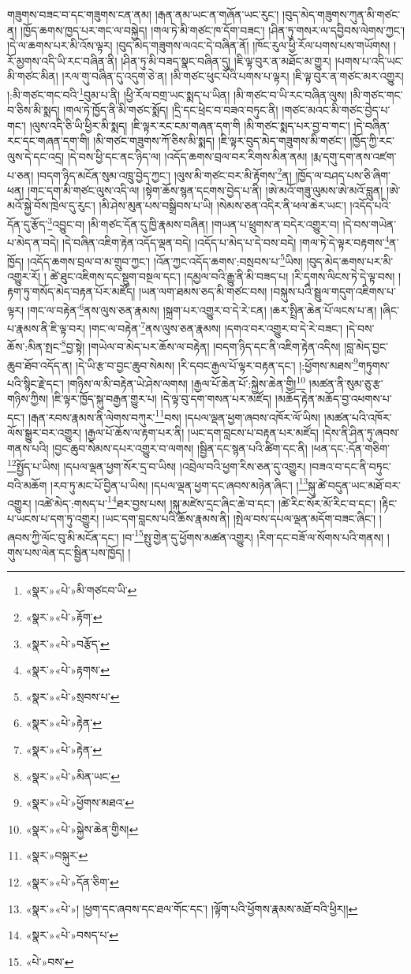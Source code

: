 གཟུགས་བཟང་བ་དང་གཟུགས་ངན་ནམ། །རྒན་ནམ་ཡང་ན་གཞོན་ཡང་རུང་། །བུད་མེད་གཟུགས་ཀུན་མི་གཙང་ན། །ཁྱོད་ཆགས་ཁྱད་པར་གང་ལ་བསྐྱེད། །གལ་ཏེ་མི་གཙང་ཁ་དོག་བཟང་། །ཤིན་ཏུ་གསར་ལ་དབྱིབས་ལེགས་ཀྱང་། །དེ་ལ་ཆགས་པར་མི་འོས་ལྟར། །བུད་མེད་གཟུགས་ལའང་དེ་བཞིན་ནོ། །ཁོང་རུལ་ཕྱི་རོལ་པགས་པས་གཡོགས། །རོ་མྱགས་འདི་ཡི་རང་བཞིན་ནི། །ཤིན་ཏུ་མི་བཟད་སྣང་བཞིན་དུ། །ཇི་ལྟ་བུར་ན་མཐོང་མ་གྱུར། །པགས་པ་འདི་ཡང་མི་གཙང་མིན། །རལ་གུ་བཞིན་དུ་འདུག་ཅེ་ན། །མི་གཙང་ཕུང་པོའི་པགས་པ་ལྟར། །ཇི་ལྟ་བུར་ན་གཙང་མར་འགྱུར། །:མི་གཙང་གང་བའི་\footnote{«སྣར་»«པེ་»མི་གཙངབ་ཡི་}བུམ་པ་ནི། །ཕྱི་རོལ་བགྲ་ཡང་སྨད་པ་ཡིན། །མི་གཙང་བ་ཡི་རང་བཞིན་ལུས། །མི་གཙང་གང་བ་ཅིས་མི་སྨད། །གལ་ཏེ་ཁྱོད་ནི་མི་གཙང་སྨོད། །དྲི་དང་ཕྲེང་བ་བཟའ་བཏུང་ནི། །གཙང་མའང་མི་གཙང་བྱེད་པ་གང་། །ལུས་འདི་ཅི་ཡི་ཕྱིར་མི་སྨད། །ཇི་ལྟར་རང་ངམ་གཞན་དག་གི །མི་གཙང་སྨད་པར་བྱ་བ་གང་། །དེ་བཞིན་རང་དང་གཞན་དག་གི། །མི་གཙང་གཟུགས་ཀོ་ཅིས་མི་སྨད། །ཇི་ལྟར་བུད་མེད་གཟུགས་མི་གཙང་། །ཁྱོད་ཀྱི་རང་ལུས་དེ་དང་འདྲ། །དེ་བས་ཕྱི་དང་ནང་ཉིད་ལ། །འདོད་ཆགས་བྲལ་བར་རིགས་མིན་ནམ། །རྨ་དགུ་དག་ནས་འཛག་པ་ཅན། །བདག་ཉིད་མངོན་སུམ་འཁྲུ་བྱེད་ཀྱང་། །ལུས་མི་གཙང་བར་མི་རྟོགས་\footnote{«སྣར་»«པེ་»རྟོག་}ན། །ཁྱོད་ལ་བཤད་པས་ཅི་ཞིག་ཕན། །གང་དག་མི་གཙང་ལུས་འདི་ལ། །སྟེག་ཆོས་སྙན་དངགས་བྱེད་པ་ནི། །ཨེ་མའོ་གཟུ་ལུམས་ཨེ་མའོ་བླུན། །ཨེ་མའོ་སྐྱེ་བོས་ཁྲེལ་དུ་རུང་། །མི་ཤེས་མུན་པས་བསྒྲིབས་པ་ཡི། །སེམས་ཅན་འདིར་ནི་ཕལ་ཆེར་ཡང་། །འདོད་པའི་དོན་དུ་རྩོད་\footnote{«སྣར་»«པེ་»བརྩོད་}འབྱུང་བ། །མི་གཙང་དོན་དུ་ཁྱི་རྣམས་བཞིན། །གཡན་པ་ཕྲུགས་ན་བདེར་འགྱུར་བ། །དེ་བས་གཡེན་པ་མེད་ན་བདེ། །དེ་བཞིན་འཇིག་རྟེན་འདོད་ལྡན་བདེ། །འདོད་པ་མེད་པ་དེ་བས་བདེ། །གལ་ཏེ་དེ་ལྟར་བརྟགས་\footnote{«སྣར་»«པེ་»རྟགས་}ན་ཁྱོད། །འདོད་ཆགས་བྲལ་བ་མ་གྲུབ་ཀྱང་། །འོན་ཀྱང་འདོད་ཆགས་:བསྲབས་པ་\footnote{«སྣར་»«པེ་»སྲབས་པ་}ཡིས། །བུད་མེད་ཆགས་པར་མི་འགྱུར་རོ། །
ཚེ་ཐུང་འཇིགས་དང་སྡུག་བསྔལ་དང་། །དམྱལ་བའི་རྒྱུ་ནི་མི་བཟད་པ། །རི་དྭགས་ལིངས་ཏེ་དེ་ལྟ་བས། །རྟག་ཏུ་གསོད་མེད་བརྟན་པོར་མཛོད། །ཡན་ལག་ཐམས་ཅད་མི་གཙང་བས། །བསྐུས་པའི་སྦྲུལ་གདུག་འཇིགས་པ་ལྟར། །གང་ལ་བརྟེན་\footnote{«སྣར་»«པེ་»རྟེན་}ནས་ལུས་ཅན་རྣམས། །སྐྲག་པར་འགྱུར་བ་དེ་རེ་ངན། །ཆར་སྤྲིན་ཆེན་པོ་ལངས་པ་ན། །ཞིང་པ་རྣམས་ནི་ཇི་ལྟ་བར། །གང་ལ་བརྟེན་\footnote{«སྣར་»«པེ་»རྟེན་}ནས་ལུས་ཅན་རྣམས། །དགའ་བར་འགྱུར་བ་དེ་རེ་བཟང་། །དེ་བས་ཆོས་:མིན་སྤང་\footnote{«སྣར་»«པེ་»མིན་ཡང་}བྱ་སྟེ། །གཡེལ་བ་མེད་པར་ཆོས་ལ་བརྟེན། །བདག་ཉིད་དང་ནི་འཇིག་རྟེན་འདིས། །བླ་མེད་བྱང་ཆུབ་ཐོབ་འདོད་ན། །དེ་ཡི་རྩ་བ་བྱང་ཆུབ་སེམས། །རི་དབང་རྒྱལ་པོ་ལྟར་བརྟན་དང་། །:ཕྱོགས་མཐས་\footnote{«སྣར་»«པེ་»ཕྱོགས་མཐའ་}གཏུགས་པའི་སྙིང་རྗེ་དང་། །གཉིས་ལ་མི་བརྟེན་ཡེ་ཤེས་ལགས། །རྒྱལ་པོ་ཆེན་པོ་:སྐྱེས་ཆེན་གྱི།\footnote{«སྣར་»«པེ་»སྐྱེས་ཆེན་གྱིས།} །མཚན་ནི་སུམ་ཅུ་རྩ་གཉིས་ཀྱིས། །ཇི་ལྟར་ཁྱོད་སྐུ་བརྒྱན་གྱུར་པ། །དེ་ལྟ་བུ་དག་གསན་པར་མཛོད། །མཆོད་རྟེན་མཆོད་བྱ་འཕགས་པ་དང་། །རྒན་རབས་རྣམས་ནི་ལེགས་བཀུར་\footnote{«སྣར་»བསྐུར་}བས། །དཔལ་ལྡན་ཕྱག་ཞབས་འཁོར་ལོ་ཡིས། །མཚན་པའི་འཁོར་ལོས་སྒྱུར་བར་འགྱུར། །རྒྱལ་པོ་ཆོས་ལ་རྟག་པར་ནི། །ཡང་དག་བླངས་པ་བརྟན་པར་མཛོད། །དེས་ནི་ཤིན་ཏུ་ཞབས་གནས་པའི། །བྱང་ཆུབ་སེམས་དཔར་འགྱུར་བ་ལགས། །སྦྱིན་དང་སྙན་པའི་ཚིག་དང་ནི། །ཕན་དང་:དོན་གཅིག་\footnote{«སྣར་»«པེ་»དོན་ཅིག་}སྤྱོད་པ་ཡིས། །དཔལ་ལྡན་ཕྱག་སོར་དྲ་བ་ཡིས། །འབྲེལ་བའི་ཕྱག་རིས་ཅན་དུ་འགྱུར། །བཟའ་བ་དང་ནི་བཏུང་བའི་མཆོག །རབ་ཏུ་མང་པོ་བྱིན་པ་ཡིས། །དཔལ་ལྡན་ཕྱག་དང་ཞབས་མཉེན་ཞིང་། །\footnote{«སྣར་»«པེ་»། །ཕྱག་དང་ཞབས་དང་ཐལ་གོང་དང་། །ལྟོག་པའི་ཕྱོགས་རྣམས་མཐོ་བའི་ཕྱིར།།}སྐུ་ཚེ་བདུན་ཡང་མཐོ་བར་འགྱུར། །འཚེ་མེད་:གསད་པ་\footnote{«སྣར་»«པེ་»བསད་པ་}ཐར་བྱས་པས། །སྐུ་མཛེས་དྲང་ཞིང་ཆེ་བ་དང་། །ཚེ་རིང་སོར་མོ་རིང་བ་དང་། །རྟིང་པ་ཡངས་པ་དག་ཏུ་འགྱུར། །ཡང་དག་བླངས་པའི་ཆོས་རྣམས་ནི། །སྤེལ་བས་དཔལ་ལྡན་མདོག་བཟང་ཞིང་། །ཞབས་ཀྱི་ལོང་བུ་མི་མངོན་དང་། །བ་\footnote{«པེ་»བས་}སྤུ་གྱེན་དུ་ཕྱོགས་མཚན་འགྱུར། །རིག་དང་བཟོ་ལ་སོགས་པའི་གནས། །གུས་པས་ལེན་དང་སྦྱིན་པས་ཁྱོད། །
